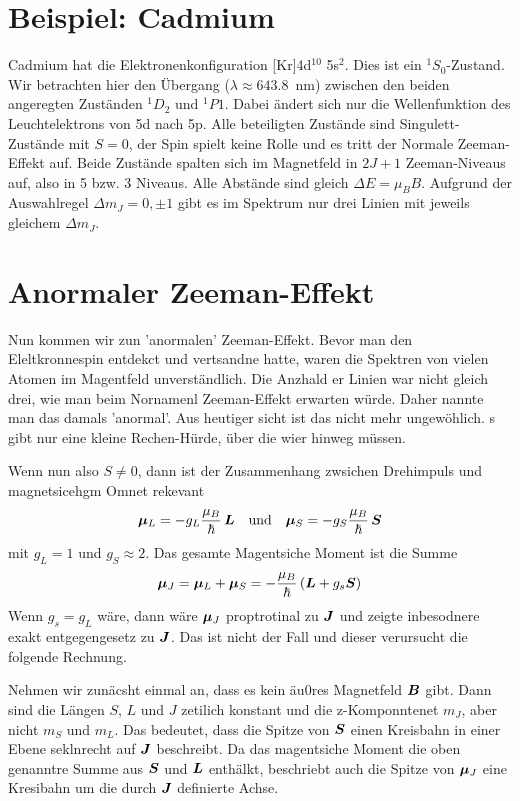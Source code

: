 \section{Beispiel: Cadmium}

Cadmium hat die Elektronenkonfiguration [Kr]4d$^{10}$ 5s$^2$. Dies ist ein $^1S_0$-Zustand. Wir betrachten hier den Übergang ($\lambda \approx 643.8$~nm) zwischen den beiden angeregten Zuständen $^1D_2$ und $^1P1$. Dabei ändert sich nur die Wellenfunktion des Leuchtelektrons von 5d nach 5p. Alle beteiligten Zustände sind Singulett-Zustände mit $S=0$, der Spin spielt keine Rolle und es tritt der Normale Zeeman-Effekt auf. Beide Zustände spalten sich im Magnetfeld in $2J+1$ Zeeman-Niveaus auf, also in 5 bzw. 3 Niveaus. Alle Abstände sind gleich $\Delta E = \mu_B B$. Aufgrund der Auswahlregel $\Delta m_J = 0, \pm1$ gibt es im Spektrum nur drei Linien mit jeweils gleichem $\Delta m_J$.


\section{Anormaler Zeeman-Effekt}

Nun kommen wir zun 'anormalen' Zeeman-Effekt. Bevor man den Eleltkronnespin entdekct und vertsandne hatte, waren die Spektren von vielen Atomen im Magentfeld unverständlich. Die Anzhald er Linien war nicht gleich drei, wie man beim Nornamenl Zeeman-Effekt erwarten würde. Daher nannte man das damals 'anormal'. Aus heutiger sicht ist das nicht mehr ungewöhlich. s gibt nur eine kleine Rechen-Hürde, über die wier hinweg müssen.

Wenn nun also $S \neq 0$, dann ist der Zusammenhang zwsichen Drehimpuls und magnetsicehgm Omnet rekevant
\begin{equation}
    \boldsymbol{\mu}_L = - g_L \frac{\mu_B}{\hbar} \, \boldsymbol{L} \quad \text{und} \quad  \boldsymbol{\mu}_S = - g_S \frac{\mu_B}{\hbar} \, \boldsymbol{S}
\end{equation}
mit $g_L = 1$ und $g_S \approx 2$. Das gesamte Magentsiche Moment ist die Summe
\begin{equation}
    \boldsymbol{\mu}_J =  \boldsymbol{\mu}_L +  \boldsymbol{\mu}_S = - \frac{\mu_B}{\hbar} \left( \boldsymbol{L} + g_s \boldsymbol{S} \right)
\end{equation}
Wenn $g_s = g_L$ wäre, dann wäre  $ \boldsymbol{\mu}_J $ proptrotinal zu $\boldsymbol{J}$ und zeigte inbesodnere  exakt entgegengesetz zu $\boldsymbol{J}$. Das ist nicht der Fall und dieser verursucht die folgende Rechnung.

Nehmen wir zunäcsht einmal an, dass es kein äu0res Magnetfeld $\boldsymbol{B}$ gibt. Dann sind die Längen $S$, $L$ und $J$ zetilich konstant und die z-Komponntenet $m_J$, aber nicht $m_S$ und $m_L$. Das bedeutet, dass die Spitze von $\boldsymbol{S}$ einen Kreisbahn in einer Ebene seklnrecht auf $\boldsymbol{J}$ beschreibt. Da das magentsiche Moment die oben genanntre Summe aus $\boldsymbol{S}$ und $\boldsymbol{L}$ enthälkt, beschriebt auch die Spitze von $\boldsymbol{\mu}_J $ eine Kresibahn um die durch $\boldsymbol{J}$ definierte Achse.

